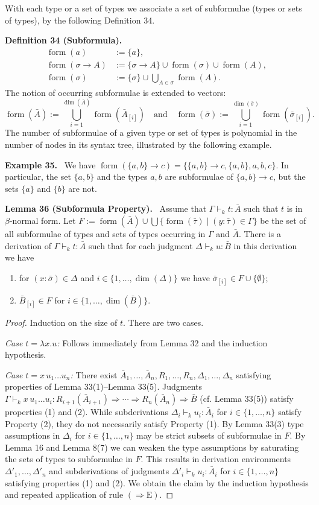 \documentclass[10pt,a4paper]{article}
\newcommand{\Av}{\bar A}\newcommand{\Bv}{\bar B}\newcommand{\Cv}{\bar C}
\newcommand{\sv}{\bar\sigma}\newcommand{\tv}{\bar\tau}
\newcommand{\dimn}{\operatorname{dim}}
\newcommand{\form}{\operatorname{form}}
\newcommand{\pmjudgment}[3]{#1\vdash_k #2:#3}
\newcommand{\orig}[2]{\par\medskip\noindent\textbf{#1 #2.}\ }
\begin{document}
With each type or a set of types we associate a set of subformulae (types or sets of types), by the following Definition 34.
\orig{Definition}{34 (Subformula)}
\begin{align*}
\form(a)&:=\{a\},\\
\form(\sigma\to A)&:=\{\sigma\to A\}\cup\form(\sigma)\cup\form(A),\\
\form(\sigma)&:=\{\sigma\}\cup\bigcup_{A\in\sigma}\form(A).
\end{align*}
The notion of occurring subformulae is extended to vectors:
\[\form(\Av):=\bigcup_{i=1}^{\dimn(\Av)}\form(\Av_{[i]})\quad\text{and}\quad\form(\sv):=\bigcup_{i=1}^{\dimn(\sv)}\form(\sv_{[i]}).\]
The number of subformulae of a given type or set of types is polynomial in the number of nodes in its syntax tree, illustrated by the following example.
\orig{Example}{35} We have $\form(\{a,b\}\to c)=\{\{a,b\}\to c,\{a,b\},a,b,c\}$. In particular, the set $\{a,b\}$ and the types $a,b$ are subformulae of $\{a,b\}\to c$, but the sets $\{a\}$ and $\{b\}$ are not.
\orig{Lemma}{36 (Subformula Property)}
Assume that $\pmjudgment\Gamma t\Av$ such that $t$ is in $\beta$-normal form. Let $F:=\form(\Av)\cup\bigcup\{\form(\tv)\mid(y:\tv)\in\Gamma\}$ be the set of all subformulae of types and sets of types occurring in $\Gamma$ and $\Av$. There is a derivation of $\pmjudgment\Gamma t\Av$ such that for each judgment $\pmjudgment\Delta u\Bv$ in this derivation we have
\begin{enumerate}
\item for $(x:\sv)\in\Delta$ and $i\in\{1,\ldots,\dimn(\Delta)\}$ we have $\sv_{[i]}\in F\cup\{\emptyset\}$;
\item $\Bv_{[i]}\in F$ for $i\in\{1,\ldots,\dimn(\Bv)\}$.
\end{enumerate}
\begin{proof}
Induction on the size of $t$. There are two cases.\par
\emph{Case $t=\lambda x.u$:} Follows immediately from Lemma 32 and the induction hypothesis.\par
\emph{Case $t=x\,u_1\ldots u_n$:} There exist $\Av_1,\ldots,\Av_n,R_1,\ldots,R_n,\Delta_1,\ldots,\Delta_n$ satisfying properties of Lemma 33(1)--Lemma 33(5). Judgments $\pmjudgment\Gamma{x\,u_1\ldots u_i}{R_{i+1}(\Av_{i+1})\Rightarrow\cdots\Rightarrow R_n(\Av_n)\Rightarrow\Bv}$ (cf. Lemma 33(5)) satisfy properties (1) and (2). While subderivations $\pmjudgment{\Delta_i}{u_i}{\Av_i}$ for $i\in\{1,\ldots,n\}$ satisfy Property (2), they do not necessarily satisfy Property (1). By Lemma 33(3) type assumptions in $\Delta_i$ for $i\in\{1,\ldots,n\}$ may be strict subsets of subformulae in $F$. By Lemma 16 and Lemma 8(7) we can weaken the type assumptions by saturating the sets of types to subformulae in $F$. This results in derivation environments $\Delta'_1,\ldots,\Delta'_n$ and subderivations of judgments $\pmjudgment{\Delta'_i}{u_i}{\Av_i}$ for $i\in\{1,\ldots,n\}$ satisfying properties (1) and (2). We obtain the claim by the induction hypothesis and repeated application of rule $(\Rightarrow\mathrm E)$.
\end{proof}
\end{document}
